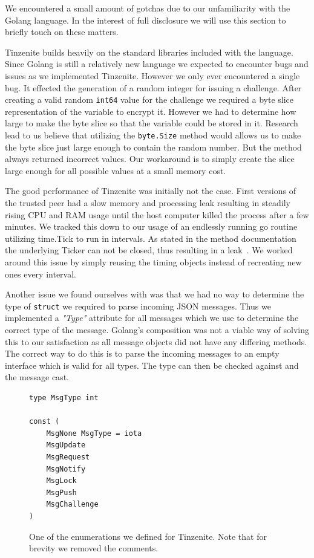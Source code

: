 We encountered a small amount of gotchas due to our unfamiliarity with the Golang language.
In the interest of full disclosure we will use this section to briefly touch on these matters.

Tinzenite builds heavily on the standard libraries included with the language.
Since Golang is still a relatively new language we expected to encounter bugs and issues as we implemented Tinzenite.
However we only ever encountered a single bug.
It effected the generation of a random integer for issuing a challenge.
After creating a valid random \texttt{int64} value for the challenge we required a byte slice representation of the variable to encrypt it.
However we had to determine how large to make the byte slice so that the variable could be stored in it.
Research lead to us believe that utilizing the \texttt{byte.Size} method would allows us to make the byte slice just large enough to contain the random number.
But the method always returned incorrect values.
Our workaround is to simply create the slice large enough for all possible values at a small memory cost.

The good performance of Tinzenite was initially not the case.
First versions of the trusted peer had a slow memory and processing leak resulting in steadily rising CPU and RAM usage until the host computer killed the process after a few minutes.
We tracked this down to our usage of an endlessly running go routine utilizing time.Tick to run in intervals.
As stated in the method documentation the underlying Ticker can not be closed, thus resulting in a leak~\cite{web:site:golang:time:tick}.
We worked around this issue by simply reusing the timing objects instead of recreating new ones every interval.

Another issue we found ourselves with was that we had no way to determine the type of \texttt{struct} we required to parse incoming JSON messages.
Thus we implemented a \textit{"Type"} attribute for all messages which we use to determine the correct type of the message.
Golang's composition was not a viable way of solving this to our satisfaction as all message objects did not have any differing methods.
The correct way to do this is to parse the incoming messages to an empty interface which is valid for all types.
The type can then be checked against and the message cast.

\begin{figure}[htp]
    \begin{lstlisting}[language=golang,firstnumber=0]
type MsgType int

const (
	MsgNone MsgType = iota
	MsgUpdate
	MsgRequest
	MsgNotify
	MsgLock
	MsgPush
	MsgChallenge
)
    \end{lstlisting}
\caption[Golang Enum Example]{One of the enumerations we defined for Tinzenite. Note that for brevity we removed the comments.}
\label{golang:enum_example}
\end{figure}

